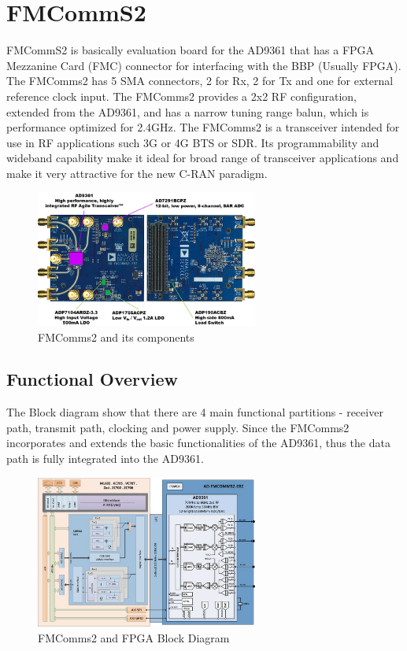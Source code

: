 \section{FMCommS2}

FMCommS2 is basically evaluation board for the AD9361 that has a FPGA Mezzanine Card (FMC) connector for interfacing with the BBP (Usually FPGA). The FMComms2 has 5 SMA connectors, 2 for Rx, 2 for Tx and one for external reference clock input. The FMComms2 provides a 2x2 RF configuration, extended from the AD9361, and has  a narrow tuning range balun, which is performance optimized for 2.4GHz.
The FMComms2 is a transceiver intended for use in RF applications such 3G or 4G BTS or SDR. Its programmability and wideband capability make it ideal for broad range of transceiver applications and make it very attractive for the new C-RAN paradigm.

\begin{figure}[htbp]
    \centering
    \includegraphics[width=0.65\textwidth]{./figures/fmcomms2_pic}
    \caption{ FMComms2 and its components
    \label{fig:fmcomm}}
\end{figure}


\subsection{Functional Overview}

The Block diagram show that there are 4 main functional partitions - receiver path, transmit path, clocking and power supply. Since the FMComms2 incorporates and extends the basic functionalities of the AD9361, thus the data path is fully integrated into the AD9361.

\begin{figure}[htbp]
    \centering
    \includegraphics[width=0.65\textwidth]{./figures/fmcomms2_bd}
    \caption{ FMComms2 and FPGA Block Diagram
    \label{fig:fmcommbd}}
\end{figure}



